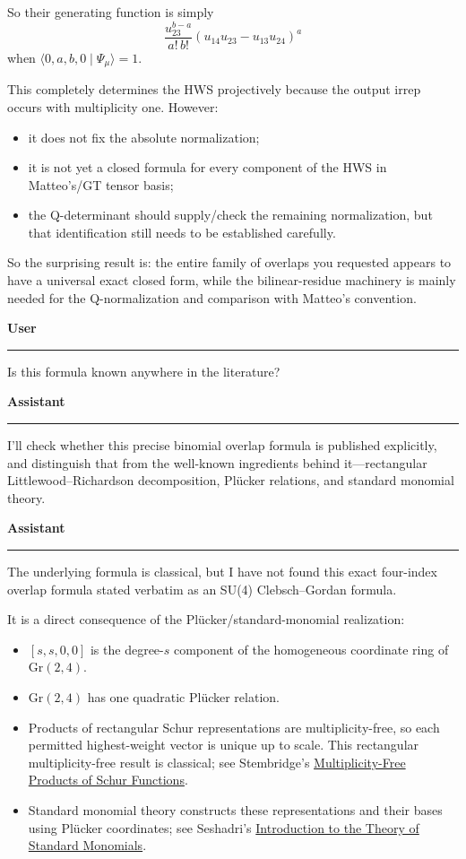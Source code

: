 \documentclass[11pt]{article}
\newcommand{\speaker}[2]{%
  \par\vspace{0.7em}%
  {\large\bfseries\color{#2}#1}\par
  \vspace{0.15em}\color{rulegray}\hrule\color{black}\vspace{0.55em}%
}
\newcommand{\Assistant}{\speaker{Assistant}{assistantblue}}
\newcommand{\User}{\speaker{User}{usergreen}}
\begin{document}
So their generating function is simply
\[
  \frac{u_{23}^{b-a}}{a!\,b!}
  (u_{14}u_{23}-u_{13}u_{24})^a
\]
when \(\langle0,a,b,0\mid\Psi_\mu\rangle=1\).

This completely determines the HWS projectively because the output irrep occurs with
multiplicity one. However:
\begin{itemize}
  \item it does not fix the absolute normalization;
  \item it is not yet a closed formula for every component of the HWS in Matteo's/GT tensor basis;
  \item the Q-determinant should supply/check the remaining normalization, but that identification
        still needs to be established carefully.
\end{itemize}

So the surprising result is: the entire family of overlaps you requested appears to have a
universal exact closed form, while the bilinear-residue machinery is mainly needed for the
Q-normalization and comparison with Matteo's convention.

\User

Is this formula known anywhere in the literature?

\Assistant

I'll check whether this precise binomial overlap formula is published explicitly, and distinguish
that from the well-known ingredients behind it---rectangular Littlewood--Richardson decomposition,
Pl\"ucker relations, and standard monomial theory.

\Assistant

The underlying formula is classical, but I have not found this exact four-index overlap formula
stated verbatim as an SU(4) Clebsch--Gordan formula.

It is a direct consequence of the Pl\"ucker/standard-monomial realization:
\begin{itemize}
  \item \([s,s,0,0]\) is the degree-\(s\) component of the homogeneous coordinate ring of
        \(\mathrm{Gr}(2,4)\).
  \item \(\mathrm{Gr}(2,4)\) has one quadratic Pl\"ucker relation.
  \item Products of rectangular Schur representations are multiplicity-free, so each permitted
        highest-weight vector is unique up to scale. This rectangular multiplicity-free result is
        classical; see Stembridge's
        \href{https://deepblue.lib.umich.edu/handle/2027.42/41839}
        {Multiplicity-Free Products of Schur Functions}.
  \item Standard monomial theory constructs these representations and their bases using Pl\"ucker
        coordinates; see Seshadri's
        \href{https://link.springer.com/book/10.1007/978-981-10-1813-8}
        {Introduction to the Theory of Standard Monomials}.
\end{itemize}
\end{document}
